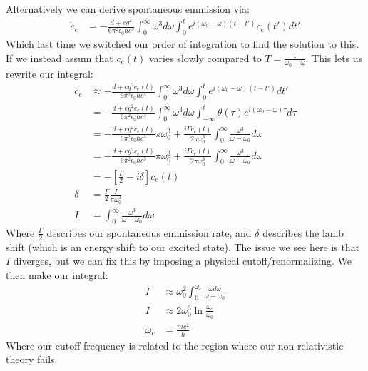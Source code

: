 Alternatively we can derive spontaneous emmission via:
\begin{align*}
	\dot{c}_e &= -\frac{d+{eg}^2}{6\pi^2\epsilon_0\hbar c^3} \int_0^\infty \omega^3d\omega\int_0^t e^{i(\omega_0-\omega)(t-t')} c_e(t') dt'
\end{align*}
Which last time we switched our order of integration to find the solution to this. If we instead assum that $c_e(t)$ varies slowly compared to $T=\frac{1}{\omega_0-\omega}$. This lets us rewrite our integral:
\begin{align*}
	\dot{c}_e &\approx -\frac{d+{eg}^2c_e(t)}{6\pi^2\epsilon_0\hbar c^3} \int_0^\infty \omega^3d\omega\int_0^t e^{i(\omega_0-\omega)(t-t')} dt' \\
	&= -\frac{d+{eg}^2c_e(t)}{6\pi^2\epsilon_0\hbar c^3} \int_0^\infty \omega^3d\omega\int_{-\infty}^t \theta(\tau) e^{i(\omega_0-\omega)\tau} d\tau \\
	&= -\frac{d+{eg}^2c_e(t)}{6\pi^2\epsilon_0\hbar c^3} \pi\omega_0^3 + \frac{i\Gamma c_e(t)}{2\pi\omega_0^3}\int_0^\infty \frac{\omega^3}{\omega - \omega_0} d\omega \\
	&= -\frac{d+{eg}^2c_e(t)}{6\pi^2\epsilon_0\hbar c^3} \pi\omega_0^3 + \frac{i\Gamma c_e(t)}{2\pi\omega_0^3}\int_0^\infty \frac{\omega^3}{\omega - \omega_0} d\omega \\
	&= -\left[\frac{\Gamma}{2} -i\delta\right]c_e(t) \\
	\delta &= \frac{\Gamma}{2} \frac{I}{\pi\omega_0^3} \\
	I &= \int_0^\infty \frac{\omega^3}{\omega - \omega_0} d\omega
\end{align*}
Where $\frac{\Gamma}{2}$ describes our spontaneous emmission rate, and $\delta$ describes the lamb shift (which is an energy shift to our excited state).
The issue we see here is that $I$ diverges, but we can fix this by imposing a physical cutoff/renormalizing. We then make our integral:
\begin{align*}
	I &\approx \omega_0^2 \int_0^{\omega_c} \frac{\omega d\omega}{\omega - \omega_0} \\
	I &\approx 2\omega_0^3 \ln\frac{\omega_c}{\omega_0} \\
	\omega_c &= \frac{mc^2}{\hbar}
\end{align*}
Where our cutoff frequency is related to the region where our non-relativistic theory fails.
